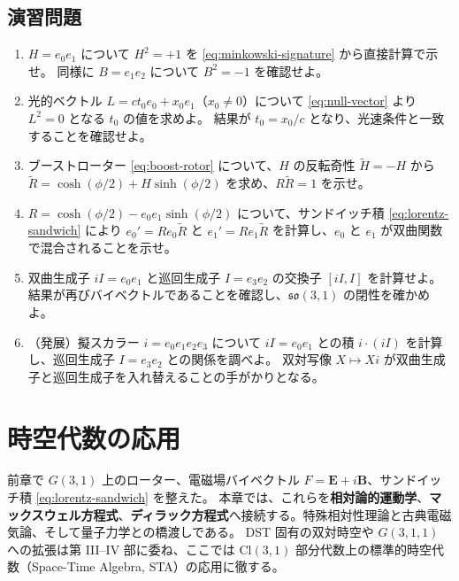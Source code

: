 \documentclass[dvipdfmx,a4paper,oneside]{jsbook}
\numberwithin{equation}{chapter}
\begin{document}
\section*{演習問題}

\begin{enumerate}[leftmargin=2em]
  \item \(H = e_0 e_1\) について \(H^2 = +1\) を \eqref{eq:minkowski-signature} から直接計算で示せ。
  同様に \(B = e_1 e_2\) について \(B^2 = -1\) を確認せよ。

  \item 光的ベクトル \(L = c t_0 e_0 + x_0 e_1\)（\(x_0 \neq 0\)）について \eqref{eq:null-vector} より \(L^2 = 0\) となる \(t_0\) の値を求めよ。
  結果が \(t_0 = x_0/c\) となり、光速条件と一致することを確認せよ。

  \item ブーストローター \eqref{eq:boost-rotor} について、\(H\) の反転奇性 \(\widetilde{H} = -H\) から \(\widetilde{R} = \cosh(\phi/2) + H\sinh(\phi/2)\) を求め、\(R\widetilde{R} = 1\) を示せ。

  \item \(R = \cosh(\phi/2) - e_0 e_1 \sinh(\phi/2)\) について、サンドイッチ積 \eqref{eq:lorentz-sandwich} により \(e_0' = R e_0 \widetilde{R}\) と \(e_1' = R e_1 \widetilde{R}\) を計算し、\(e_0\) と \(e_1\) が双曲関数で混合されることを示せ。

  \item 双曲生成子 \(iI = e_0 e_1\) と巡回生成子 \(I = e_3 e_2\) の交換子 \([iI, I]\) を計算せよ。
  結果が再びバイベクトルであることを確認し、\(\mathfrak{so}(3,1)\) の閉性を確かめよ。

  \item （発展）擬スカラー \(i = e_0 e_1 e_2 e_3\) について \(iI = e_0 e_1\) との積 \(i \cdot (iI)\) を計算し、巡回生成子 \(I = e_3 e_2\) との関係を調べよ。
  双対写像 \(X \mapsto Xi\) が双曲生成子と巡回生成子を入れ替えることの手がかりとなる。
\end{enumerate}

\chapter{時空代数の応用}

前章で \(G(3,1)\) 上のローター、電磁場バイベクトル \(F=\mathbf{E}+i\mathbf{B}\)、サンドイッチ積 \eqref{eq:lorentz-sandwich} を整えた。
本章では、これらを\textbf{相対論的運動学}、\textbf{マックスウェル方程式}、\textbf{ディラック方程式}へ接続する。特殊相対性理論と古典電磁気論、そして量子力学との橋渡しである。
DST 固有の双対時空や \(G(3,1,1)\) への拡張は第 III--IV 部に委ね、ここでは \(\mathrm{Cl}(3,1)\) 部分代数上の標準的時空代数（Space-Time Algebra, STA）の応用に徹する。
\end{document}

